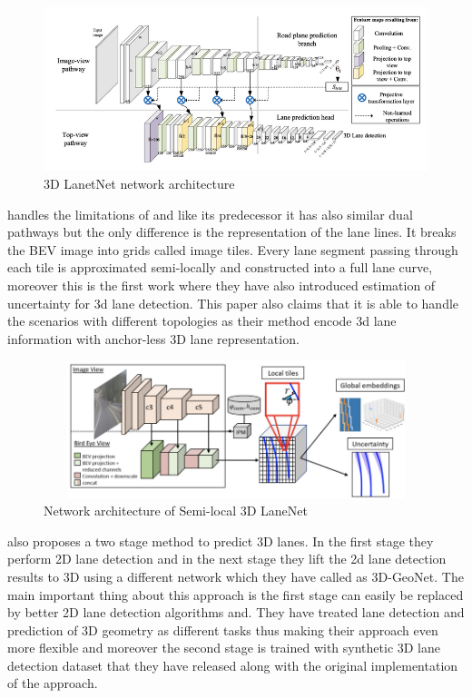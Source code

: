 \begin{figure}[h]
    \centering
    \includegraphics[width=\textwidth]{images/3dlanenet.png}
    \caption{\cite{DBLP:journals/corr/abs-1811-10203} 3D LanetNet network architecture}
    \end{figure}

\cite{DBLP:journals/corr/abs-2011-01535} handles the limitations of \cite{DBLP:journals/corr/abs-1811-10203} and like its predecessor it has also similar dual pathways but the only difference is the representation of the lane lines. It breaks the BEV image into grids called image tiles.
Every lane segment passing through each tile is approximated semi-locally and constructed into a full lane curve, moreover this is the first work where they have also introduced estimation of uncertainty for 3d lane detection. This paper also claims that it is able to handle the scenarios with different topologies as their method encode 3d lane information with anchor-less 3D lane representation. 

 \begin{figure}[h]
    \centering
    \includegraphics[width=12cm, height=4cm]{images/3DLaneNET++.png}
    \caption{Network architecture of Semi-local 3D LaneNet \cite{DBLP:journals/corr/abs-2011-01535}}
    \end{figure}

\cite{guo2020gen} also proposes a two stage method to predict 3D lanes. In the first stage they perform 2D lane detection and in the next stage they lift the 2d lane detection results to 3D using a different network which they have called as 3D-GeoNet. The main important thing about this approach is the first stage can easily be replaced by better 2D lane detection algorithms and. They have treated lane detection and prediction of 3D geometry as different tasks thus making their approach even more flexible and moreover the second stage is trained with synthetic 3D lane detection dataset that they have released along with the original implementation of the approach. 

